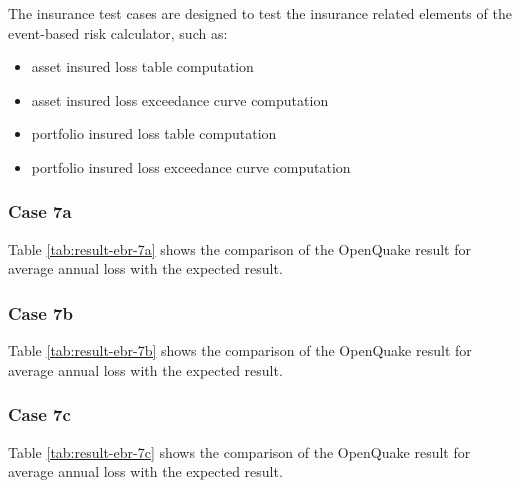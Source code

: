The insurance test cases are designed to test the insurance related elements of the event-based risk calculator, such as:

\begin{itemize}
\item asset insured loss table computation
\item asset insured loss exceedance curve computation
\item portfolio insured loss table computation
\item portfolio insured loss exceedance curve computation
\end{itemize}

\subsubsection{Case 7a}


Table \ref{tab:result-ebr-7a} shows the comparison of the OpenQuake result for average annual loss with the expected result.

\subsubsection{Case 7b}


Table \ref{tab:result-ebr-7b} shows the comparison of the OpenQuake result for average annual loss with the expected result.

\subsubsection{Case 7c}


Table \ref{tab:result-ebr-7c} shows the comparison of the OpenQuake result for average annual loss with the expected result.